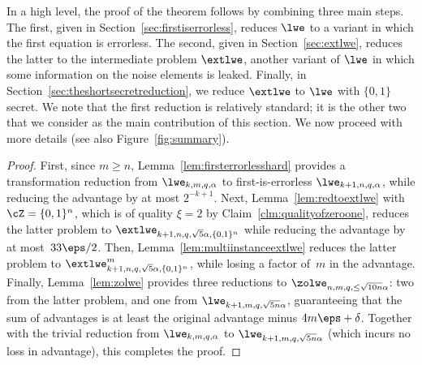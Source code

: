 In a high level, the proof of the theorem follows by combining three main steps. The first, given in
Section~\ref{sec:firstiserrorless}, reduces $\lwe$ to a variant in which the first
equation is errorless. The second, given in Section~\ref{sec:extlwe}, reduces
the latter to the intermediate problem $\extlwe$, another variant of $\lwe$ in which some information 
on the noise elements is leaked. Finally, in Section~\ref{sec:theshortsecretreduction},
we reduce $\extlwe$ to $\lwe$ with $\{0,1\}$ secret. We note that the first reduction is
relatively standard; it is the other two that we consider as the main contribution
of this section. We now proceed with more details (see also Figure~\ref{fig:summary}). 

\begin{proof}
First, since $m \ge n$, Lemma~\ref{lem:firsterrorlesshard} provides a transformation reduction
from $\lwe_{k, m, q, \alpha}$ to first-is-errorless $\lwe_{k+1, n, q, \alpha}$, while reducing the advantage by at most $2^{-k+1}$. 
Next, Lemma~\ref{lem:redtoextlwe} with $\cZ = \{0,1\}^n$, which is of quality $\xi=2$ by 
Claim~\ref{clm:qualityofzeroone}, reduces the latter problem to $\extlwe_{k+1, n, q,\sqrt{5}\alpha,\{0,1\}^n}$ while 
reducing the advantage by at most~$33 \eps/2$. Then, Lemma~\ref{lem:multiinstanceextlwe} reduces the latter problem
to $\extlwe^m_{k+1, n, q, \sqrt{5} \alpha,\{0,1\}^n}$, while losing a factor of~$m$ in the advantage. 
Finally, Lemma~\ref{lem:zolwe} provides three reductions to $\zolwe_{n, m, q, \le \sqrt{10n} \alpha}$: two from the latter problem, and one from
$\lwe_{k+1, m, q,\sqrt{5n} \alpha}$, guaranteeing that the sum of advantages is at least the original advantage minus $4 m \eps + \delta$.
Together with the trivial reduction from $\lwe_{k, m, q,\alpha}$ to $\lwe_{k+1, m, q, \sqrt{5n} \alpha}$ (which incurs no loss in advantage), this
completes the proof. 
\end{proof}

